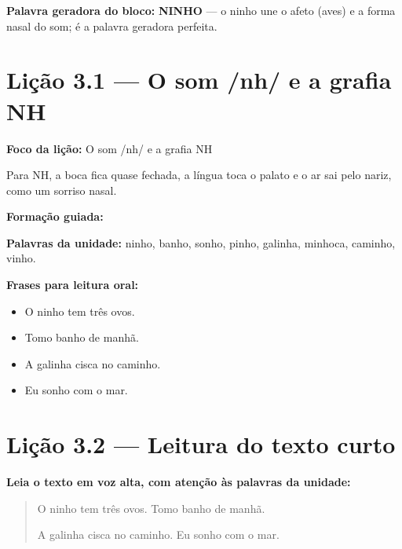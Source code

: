 \textbf{Palavra geradora do bloco:} \textbf{NINHO} --- o ninho une o afeto (aves) e a forma nasal do som; é a palavra geradora perfeita.

\section{Lição 3.1 --- O som /nh/ e a grafia NH}

\textbf{Foco da lição:} O som /nh/ e a grafia NH


\begin{boquinha}
Para NH, a boca fica quase fechada, a língua toca o palato e o ar sai pelo nariz, como um sorriso nasal.
\end{boquinha}

\noindent\textbf{Formação guiada:}

\begin{center}
\end{center}

\noindent\textbf{Palavras da unidade:} ninho, banho, sonho, pinho, galinha, minhoca, caminho, vinho.

\noindent\textbf{Frases para leitura oral:}
\begin{itemize}[leftmargin=1.6em]
  \item O ninho tem três ovos.
  \item Tomo banho de manhã.
  \item A galinha cisca no caminho.
  \item Eu sonho com o mar.
\end{itemize}

\section{Lição 3.2 --- Leitura do texto curto}

\noindent\textbf{Leia o texto em voz alta, com atenção às palavras da unidade:}


\begin{quote}
O ninho tem três ovos. Tomo banho de manhã.

A galinha cisca no caminho. Eu sonho com o mar.
\end{quote}

